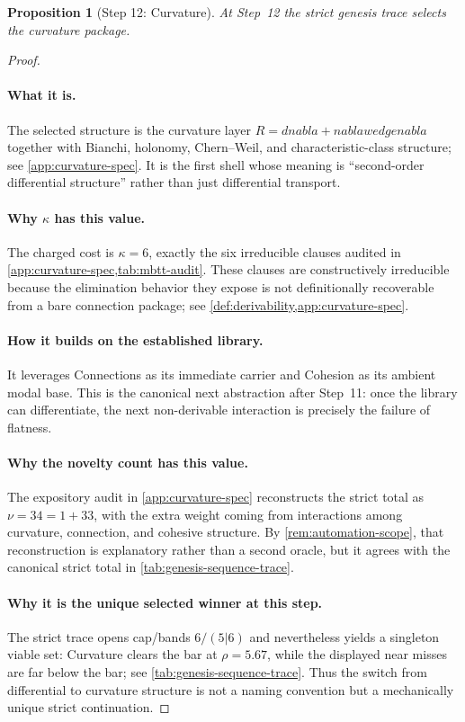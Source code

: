 \documentclass[11pt,a4paper]{article}
\def\nabla{nabla}%
\def\wedge{wedge}%
\theoremstyle{plain}
\newtheorem{proposition}[theorem]{Proposition}
\theoremstyle{definition}
\theoremstyle{remark}
\begin{document}
\begin{proposition}[Step 12: Curvature]
\label{prop:genesis-step12}
At Step~12 the strict genesis trace selects the curvature package.
\end{proposition}

\begin{proof}
\paragraph{What it is.}
The selected structure is the curvature layer
$R=d\nabla+\nabla\wedge\nabla$ together with Bianchi, holonomy, Chern--Weil, and
characteristic-class structure; see \cref{app:curvature-spec}.
It is the first shell whose meaning is ``second-order differential structure''
rather than just differential transport.

\paragraph{Why $\kappa$ has this value.}
The charged cost is $\kappa=6$, exactly the six irreducible clauses audited in
\cref{app:curvature-spec,tab:mbtt-audit}.
These clauses are constructively irreducible because the elimination behavior
they expose is not definitionally recoverable from a bare connection package;
see \cref{def:derivability,app:curvature-spec}.

\paragraph{How it builds on the established library.}
It leverages Connections as its immediate carrier and Cohesion as its ambient
modal base.
This is the canonical next abstraction after Step~11: once the library can
differentiate, the next non-derivable interaction is precisely the failure of
flatness.

\paragraph{Why the novelty count has this value.}
The expository audit in \cref{app:curvature-spec} reconstructs the strict total
as $\nu=34=1+33$, with the extra weight coming from interactions among
curvature, connection, and cohesive structure.
By \cref{rem:automation-scope}, that reconstruction is explanatory rather than a
second oracle, but it agrees with the canonical strict total in
\cref{tab:genesis-sequence-trace}.

\paragraph{Why it is the unique selected winner at this step.}
The strict trace opens cap/bands $6/(5|6)$ and nevertheless yields a singleton
viable set: Curvature clears the bar at $\rho=5.67$, while the displayed near
misses are far below the bar; see \cref{tab:genesis-sequence-trace}.
Thus the switch from differential to curvature structure is not a naming
convention but a mechanically unique strict continuation.
\end{proof}
\end{document}
